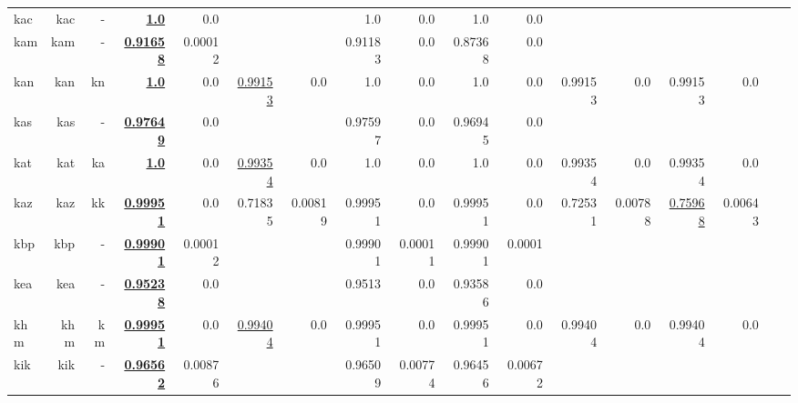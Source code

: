 \documentclass[11pt]{article}
\begin{document}
\begin{table*}[h]
{\begin{tabular}{lrrrrrrrrrrrrrrrr}
kac         & kac         & -         & \textbf{\underline{1.0}}         & 0.0         &          &          & 1.0         & 0.0         & 1.0         & 0.0         &          &          &          &          \\
kam         & kam         & -         & \textbf{\underline{0.91658}}         & 0.00012         &          &          & 0.91183         & 0.0         & 0.87368         & 0.0         &          &          &          &          \\
kan         & kan         & kn         & \textbf{\underline{1.0}}         & 0.0         & \underline{0.99153}         & 0.0         & 1.0         & 0.0         & 1.0         & 0.0         & 0.99153         & 0.0         & 0.99153         & 0.0         \\
kas         & kas         & -         & \textbf{\underline{0.97649}}         & 0.0         &          &          & 0.97597         & 0.0         & 0.96945         & 0.0         &          &          &          &          \\
kat         & kat         & ka         & \textbf{\underline{1.0}}         & 0.0         & \underline{0.99354}         & 0.0         & 1.0         & 0.0         & 1.0         & 0.0         & 0.99354         & 0.0         & 0.99354         & 0.0         \\
kaz         & kaz         & kk         & \textbf{\underline{0.99951}}         & 0.0         & 0.71835         & 0.00819         & 0.99951         & 0.0         & 0.99951         & 0.0         & 0.72531         & 0.00788         & \underline{0.75968}         & 0.00643         \\
kbp         & kbp         & -         & \textbf{\underline{0.99901}}         & 0.00012         &          &          & 0.99901         & 0.00011         & 0.99901         & 0.0001         &          &          &          &          \\
kea         & kea         & -         & \textbf{\underline{0.95238}}         & 0.0         &          &          & 0.9513         & 0.0         & 0.93586         & 0.0         &          &          &          &          \\
khm         & khm         & km         & \textbf{\underline{0.99951}}         & 0.0         & \underline{0.99404}         & 0.0         & 0.99951         & 0.0         & 0.99951         & 0.0         & 0.99404         & 0.0         & 0.99404         & 0.0         \\
kik         & kik         & -         & \textbf{\underline{0.96562}}         & 0.00876         &          &          & 0.96509         & 0.00774         & 0.96456         & 0.00672         &          &          &          &          \\

\end{tabular}}
\end{table*}
\end{document}
